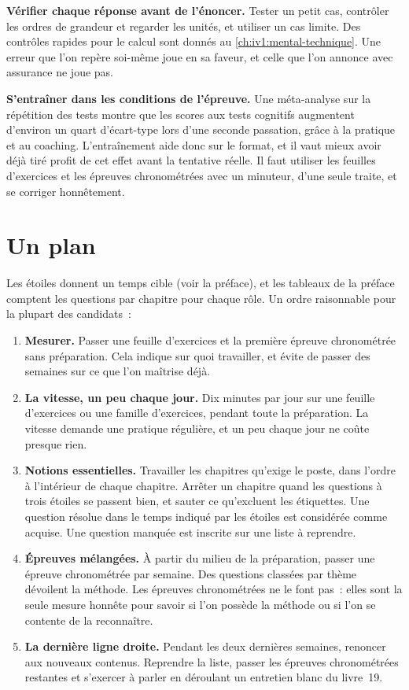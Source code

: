 \textbf{Vérifier chaque réponse avant de l'énoncer.} Tester un petit cas, contrôler les ordres de grandeur et regarder les unités, et utiliser un cas limite. Des contrôles rapides pour le calcul sont donnés au \cref{ch:iv1:mental-technique}. Une erreur que l'on repère soi-même joue en sa faveur, et celle que l'on annonce avec assurance ne joue pas.

\textbf{S'entraîner dans les conditions de l'épreuve.} Une méta-analyse sur la répétition des tests montre que les scores aux tests cognitifs augmentent d'environ un quart d'écart-type lors d'une seconde passation, grâce à la pratique et au coaching. L'entraînement aide donc sur le format, et il vaut mieux avoir déjà tiré profit de cet effet avant la tentative réelle. Il faut utiliser les feuilles d'exercices et les épreuves chronométrées avec un minuteur, d'une seule traite, et se corriger honnêtement.

\section{Un plan}

Les étoiles donnent un temps cible (voir la préface), et les tableaux de la préface comptent les questions par chapitre pour chaque rôle. Un ordre raisonnable pour la plupart des candidats~:

\begin{enumerate}
\item \textbf{Mesurer.} Passer une feuille d'exercices et la première épreuve chronométrée sans préparation. Cela indique sur quoi travailler, et évite de passer des semaines sur ce que l'on maîtrise déjà.
\item \textbf{La vitesse, un peu chaque jour.} Dix minutes par jour sur une feuille d'exercices ou une famille d'exercices, pendant toute la préparation. La vitesse demande une pratique régulière, et un peu chaque jour ne coûte presque rien.
\item \textbf{Notions essentielles.} Travailler les chapitres qu'exige le poste, dans l'ordre à l'intérieur de chaque chapitre. Arrêter un chapitre quand les questions à trois étoiles se passent bien, et sauter ce qu'excluent les étiquettes. Une question résolue dans le temps indiqué par les étoiles est considérée comme acquise. Une question manquée est inscrite sur une liste à reprendre.
\item \textbf{Épreuves mélangées.} À partir du milieu de la préparation, passer une épreuve chronométrée par semaine. Des questions classées par thème dévoilent la méthode. Les épreuves chronométrées ne le font pas~: elles sont la seule mesure honnête pour savoir si l'on possède la méthode ou si l'on se contente de la reconnaître.
\item \textbf{La dernière ligne droite.} Pendant les deux dernières semaines, renoncer aux nouveaux contenus. Reprendre la liste, passer les épreuves chronométrées restantes et s'exercer à parler en déroulant un entretien blanc du livre~19.
\end{enumerate}

